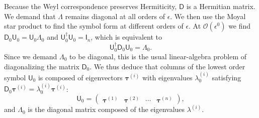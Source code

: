 %
Because the Weyl correspondence preserves Hermiticity, $\mathsf{D}$ is a Hermitian matrix.
We demand that $\Lambda$ remains diagonal at all orders of $\epsilon$.
We then use the Moyal star product to find the symbol form at different orders of $\epsilon$.
At $\mathcal{O}(\epsilon^0)$ we find $\mathsf{D}_{0}\mathsf{U}_{0} = \mathsf{U}_{0}\Lambda_{0}$ and $\mathsf{U}_{0}^{\dagger}\mathsf{U}_{0} = \mathsf{I}_{n}$, which is equivalent to
%
\begin{equation}
  \mathsf{U}_{0}^{\dagger}\mathsf{D}_{0}\mathsf{U}_{0} = \Lambda_{0}.\label{eq:omega0}
\end{equation}
%
Since we demand $\Lambda_{0}$ to be diagonal, this is the usual linear-algebra problem of diagonalizing the matrix $\mathsf{D}_{0}$.
We thus deduce that columns of the lowest order symbol $\mathsf{U}_{0}$ is composed of eigenvectors $\bm{\tau}^{(i)}$ with eigenvalues $\lambda_{0}^{(i)}$ satisfying $\mathsf{D}_{0}\bm{\tau}^{(i)} = \lambda_{0}^{(i)}\bm{\tau}^{(i)}$:
%
\begin{equation}
  \mathsf{U}_{0} =
  \begin{pmatrix}
    \bm{\tau}^{(1)} & \bm{\tau}^{(2)} & \cdots & \bm{\tau}^{(n)}
  \end{pmatrix},
\end{equation}
%
and $\Lambda_{0}$ is the diagonal matrix composed of the eigenvalues $\lambda^{(i)}$.

